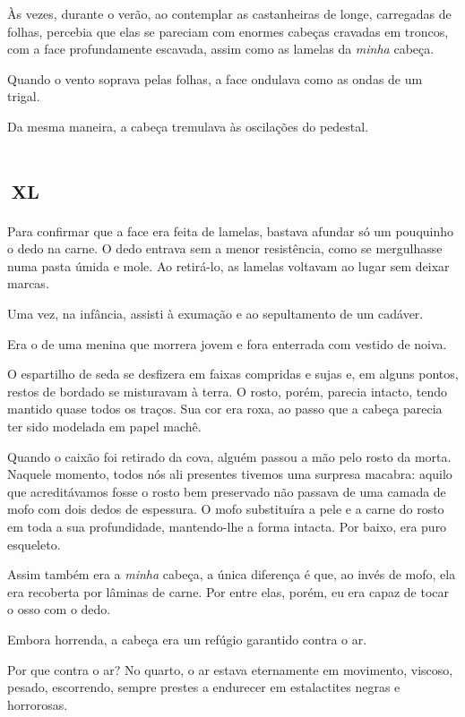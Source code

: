 Às vezes, durante o verão, ao contemplar as castanheiras de longe, carregadas de folhas, percebia que elas se pareciam com enormes cabeças cravadas em troncos, com a face profundamente escavada, assim como as lamelas da \textit{minha} cabeça.

Quando o vento soprava pelas folhas, a face ondulava como as ondas de um trigal.

Da mesma maneira, a cabeça tremulava às oscilações do pedestal.


\chapter*{\small{}\,\Large\centering\textsc{xl}\,\small{}}

Para confirmar que a face era feita de lamelas, bastava afundar só um pouquinho o dedo na carne. O dedo entrava sem a menor resistência, como se mergulhasse numa pasta úmida e mole. Ao retirá-lo, as lamelas voltavam ao lugar sem deixar marcas.

Uma vez, na infância, assisti à exumação e ao sepultamento de um cadáver.

Era o de uma menina que morrera jovem e fora enterrada com vestido de noiva. 

O espartilho de seda se desfizera em faixas compridas e sujas e, em alguns pontos, restos de bordado se misturavam à terra. O rosto, porém, parecia intacto, tendo mantido quase todos os traços. Sua cor era roxa, ao passo que a cabeça parecia ter sido modelada em papel machê.

Quando o caixão foi retirado da cova, alguém passou a mão pelo rosto da morta. Naquele momento, todos nós ali presentes tivemos uma surpresa macabra: aquilo que acreditávamos fosse o rosto bem preservado não passava de uma camada de mofo com dois dedos de espessura. O mofo substituíra a pele e a carne do rosto em toda a sua profundidade, mantendo-lhe a forma intacta. Por baixo, era puro esqueleto.

Assim também era a \textit{minha} cabeça, a única diferença é que, ao invés de mofo, ela era recoberta por lâminas de carne. Por entre elas, porém, eu era capaz de tocar o osso com o dedo.

Embora horrenda, a cabeça era um refúgio garantido contra o ar.

Por que contra o ar? No quarto, o ar estava eternamente em movimento, viscoso, pesado, escorrendo, sempre prestes a endurecer em estalactites negras e horrorosas.

